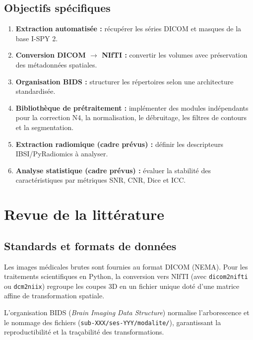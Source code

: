 \documentclass[12pt,a4paper]{report}
\begin{document}
    \subsection{Objectifs spécifiques}
    \begin{enumerate}
        \item \textbf{Extraction automatisée :} récupérer les séries DICOM et masques de la base I-SPY 2.
        \item \textbf{Conversion DICOM $\rightarrow$ NIfTI :} convertir les volumes avec préservation des métadonnées spatiales.
        \item \textbf{Organisation BIDS :} structurer les répertoires selon une architecture standardisée.
        \item \textbf{Bibliothèque de prétraitement :} implémenter des modules indépendants pour la correction N4, la normalisation, le débruitage, les filtres de contours et la segmentation.
        \item \textbf{Extraction radiomique (cadre prévus) :} définir les descripteurs IBSI/PyRadiomics à analyser.
        \item \textbf{Analyse statistique (cadre prévus) :} évaluer la stabilité des caractéristiques par métriques SNR, CNR, Dice et ICC.
    \end{enumerate}

    \section{Revue de la littérature}
    
    \subsection{Standards et formats de données}
    Les images médicales brutes sont fournies au format DICOM (NEMA). Pour les traitements scientifiques en Python, la conversion vers NIfTI (avec \texttt{dicom2nifti} ou \texttt{dcm2niix}) regroupe les coupes 3D en un fichier unique doté d'une matrice affine de transformation spatiale.
    
    L'organisation BIDS (\textit{Brain Imaging Data Structure}) normalise l'arborescence et le nommage des fichiers (\texttt{sub-XXX/ses-YYY/modalite/}), garantissant la reproductibilité et la traçabilité des transformations.
\end{document}
